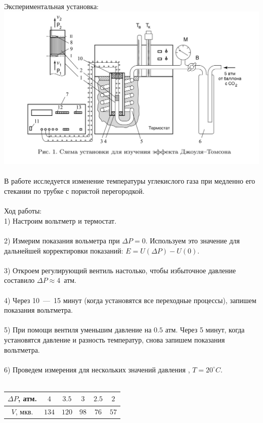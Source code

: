 \documentclass[12pt,a4paper]{article}
\begin{document}
    Экспериментальная установка: \\
    \includegraphics[scale=0.4]{ust.jpg}\\\\
    В работе исследуется изменение температуры углекислого газа при медленно его стекании по трубке с пористой перегородкой. \\\\
    Ход работы: \\
	1) Настроим вольтметр и термостат. \\\\
	2) Измерим показания вольметра при $\Delta P = 0$. Используем это значение для дальнейшей корректировки показаний: $E = U(\Delta P) - U(0)$. \\\\
	3) Откроем регулирующий вентиль настолько, чтобы избыточное давление составило $\Delta P \approx4$~атм.\\\\
	4) Через 10~---~15 минут (когда установятся все переходные процессы), запишем показания вольтметра. \\\\
	5) При помощи вентиля уменьшим давление на $0.5$ атм. Через 5 минут, когда установятся давление и разность температур, снова запишем показания вольтметра. \\\\
	6) Проведем измерения для нескольких значений давления , $T = 20^{\circ}C$.\\\\
	\begin{tabular}{c | c | c | c | c | c}
		$\Delta P$, атм. & $4$ & $3.5$ & $3$ & $2.5$ & $2$ \\ \hline
		$V$, мкв. & $134$ & $120$ & $98$ & $76$ & $57$ \\
	\end{tabular}\\\\
\end{document}
